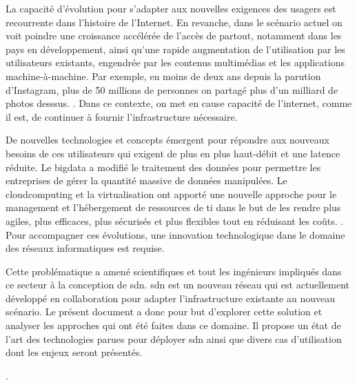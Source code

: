 \par
La capacité d'évolution pour s'adapter aux nouvelles exigences des usagers est recourrente dans l'histoire de l'Internet. 
En revanche, dans le scénario actuel on voit poindre une croissance accélérée de l'accès de partout, notamment dans les pays en développement, ainsi qu'une rapide augmentation de l'utilisation par les utilisateurs existants, engendrée par les contenus multimédias et les applications machine-à-machine. Par exemple, en moins de deux ans depuis la parution d'Instagram, plus de 50 millions de personnes on partagé plus d'un milliard de photos desssus. \cite{deuxAnsInstagram}.
Dans ce contexte, on met en cause capacité de l'internet, comme il est, de continuer à fournir l'infrastructure nécessaire. \cite{InternetSustainGrowthIntro}
\par
De nouvelles technologies et concepts émergent pour répondre aux nouveaux besoins de ces utilisateurs qui exigent de plus en plus haut-débit et une latence réduite. Le \gls{bigdata} a modifié le traitement des données pour permettre les entreprises de gérer la quantité massive de données manipulées. \cite{IMBigData} Le \gls{cloudcomputing} et la \gls{virtualisation} ont apporté une nouvelle approche pour le management et l'hébergement de ressources de \gls{ti} dans le but de les rendre plus agiles, plus efficaces, plus sécurisés et plus flexibles tout en réduisant les coûts. \cite{CloudComputingIntelVision}. Pour accompagner ces évolutions, une innovation technologique dans le domaine des réseaux informatiques est requise. \cite{InternetEvolutionRoleSoftwareEngineeringConclusion}
\par
Cette problématique a amené scientifiques et tout les ingénieurs impliqués dans ce secteur à la conception de \gls{sdn}. \gls{sdn} est un nouveau  réseau qui est actuellement développé en collaboration pour adapter l'infrastructure existante au nouveau scénario.\cite{OpenFlowStanford} Le présent document a donc pour but d'explorer cette solution et analyser les approches qui ont été faites dans ce domaine. Il propose un état de l'art des technologies parues pour déployer \gls{sdn} ainsi que divers cas d'utilisation dont les enjeux seront présentés.
\par
[un paragraphe pour le plan du texte (de quoi parle chaque section)]
\par
[Un paragraphe pour conclure l'intro et laisser les pistes de mon point de vue et les conclusions trouvées].


